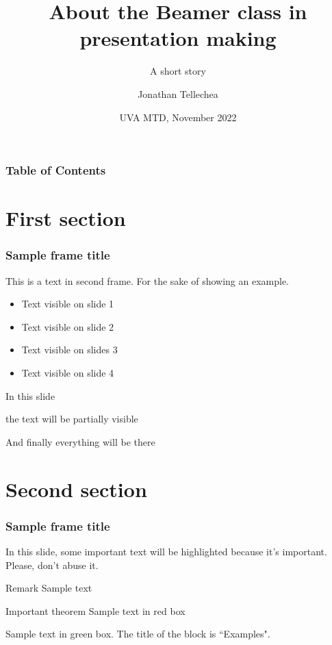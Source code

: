 \documentclass[unknownkeysallowed,xcolor=dvipsnames]{beamer}
\title[About Beamer] %
{About the Beamer class in presentation making}
\subtitle{A short story}
\author[Jonathan, Tellechea] %
{Jonathan Tellechea}
\institute[UVA] %
{
  University of Virginia
}
\date[UVA-MTD] %
{UVA MTD, November 2022}
\begin{document}
\frame{\titlepage}


\begin{frame}
\frametitle{Table of Contents}
\tableofcontents
\end{frame}


\section{First section}

\begin{frame}
\frametitle{Sample frame title}
This is a text in second frame. For the sake of showing an example.

\begin{itemize}
    \item<1-> Text visible on slide 1
    \item<2-> Text visible on slide 2
    \item<3> Text visible on slides 3
    \item<4-> Text visible on slide 4
\end{itemize}
\end{frame}



\begin{frame}
In this slide \pause

the text will be partially visible \pause

And finally everything will be there
\end{frame}

\section{Second section}

\begin{frame}
\frametitle{Sample frame title}

In this slide, some important text will be
\alert{highlighted} because it's important.
Please, don't abuse it.

\begin{block}{Remark}
Sample text
\end{block}

\begin{alertblock}{Important theorem}
Sample text in red box
\end{alertblock}

\begin{examples}
Sample text in green box. The title of the block is ``Examples".
\end{examples}
\end{frame}
\end{document}
